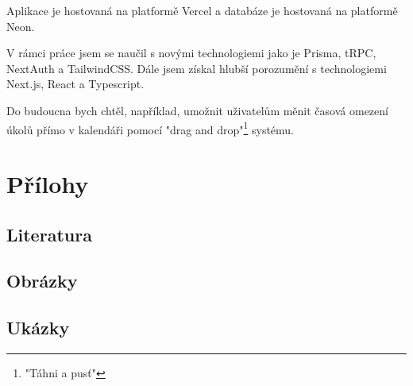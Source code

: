 \documentclass[a4paper,12pt]{report}
\begin{document}
Aplikace je hostovaná na platformě Vercel\cite{vercel} a databáze je hostovaná na platformě Neon\cite{neon}.

V rámci práce jsem se naučil s novými technologiemi jako je Prisma, tRPC, NextAuth a TailwindCSS. Dále jsem získal hlubší porozumění s technologiemi Next.js, React a Typescript.

Do budoucna bych chtěl, například, umožnit uživatelům měnit časová omezení úkolů přímo v kalendáři pomocí "drag and drop"\footnote{"Táhni a pusť"} systému.
\chapter{Přílohy}


\let\clearpage\relax
\section{Literatura}
\printbibliography[heading=none]
\pagebreak
\section{Obrázky}
\vspace{-64pt}
\listoffigures
\pagebreak
\section{Ukázky}
\vspace{-48pt}
\lstlistoflistings
\end{document}
